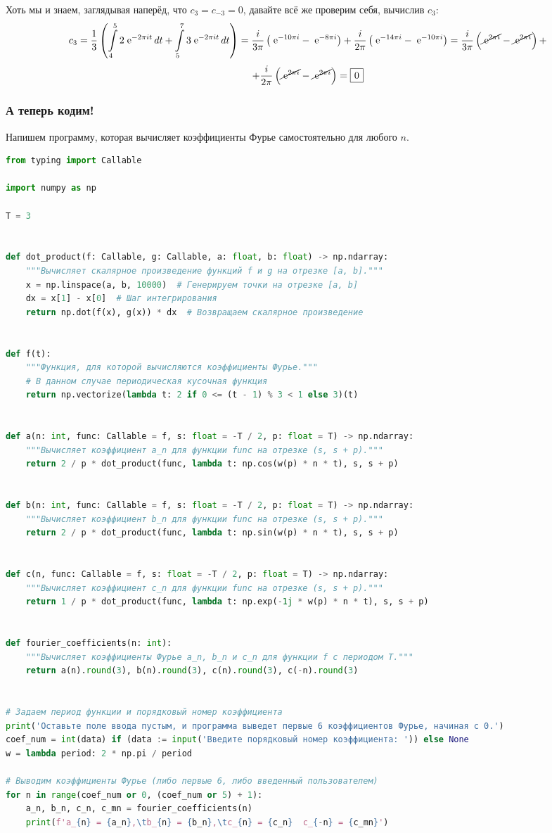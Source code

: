 \documentclass[a4paper]{article}
\newcommand{\addsubsubsection}[1]{
    \phantomsection
    \addcontentsline{toc}{subsubsection}{#1}
    \subsubsection*{\centering #1}
}
\newcommand*\msquared[1]{\tikz[baseline=(char.base)]{
            \node[shape=rectangle,draw,inner sep=4pt] (char) {$\displaystyle #1$};}}
\newcommand{\e}{\;\text{e}}
\let\oldint\int
\def\int{\oldint\limits}
\begin{document}
Хоть мы и знаем, заглядывая наперёд, что $c_3 = c_{-3} = 0$, давайте всё же проверим себя, вычислив $c_3$:
$$c_3 = \frac{1}{3}\left( \int_{4}^{5} 2\e^{-2\pi it}\,dt + \int_{5}^{7} 3\e^{-2\pi it}\,dt \right) = \frac{i}{3\pi}\left( \e^{-10\pi i} - \e^{-8\pi i} \right) + \frac{i}{2\pi}\left( \e^{-14\pi i} - \e^{-10\pi i} \right) = \frac{i}{3\pi}\left( \cancel{\e^{2\pi i}} - \cancel{\e^{2\pi i}} \right) +$$
$$+ \frac{i}{2\pi}\left( \cancel{\e^{2\pi i}} - \cancel{\e^{2\pi i}} \right) = \msquared{0}$$
\addsubsubsection{А теперь кодим!}
Напишем программу, которая вычисляет коэффициенты Фурье самостоятельно для любого $n$.
\begin{lstlisting}[language=Python, caption=Вычисление коэффициентов Фурье для кусочной функции]
from typing import Callable

import numpy as np

T = 3


def dot_product(f: Callable, g: Callable, a: float, b: float) -> np.ndarray:
    """Вычисляет скалярное произведение функций f и g на отрезке [a, b]."""
    x = np.linspace(a, b, 10000)  # Генерируем точки на отрезке [a, b]
    dx = x[1] - x[0]  # Шаг интегрирования
    return np.dot(f(x), g(x)) * dx  # Возвращаем скалярное произведение


def f(t):
    """Функция, для которой вычисляются коэффициенты Фурье."""
    # В данном случае периодическая кусочная функция
    return np.vectorize(lambda t: 2 if 0 <= (t - 1) % 3 < 1 else 3)(t)


def a(n: int, func: Callable = f, s: float = -T / 2, p: float = T) -> np.ndarray:
    """Вычисляет коэффициент a_n для функции func на отрезке (s, s + p)."""
    return 2 / p * dot_product(func, lambda t: np.cos(w(p) * n * t), s, s + p)


def b(n: int, func: Callable = f, s: float = -T / 2, p: float = T) -> np.ndarray:
    """Вычисляет коэффициент b_n для функции func на отрезке (s, s + p)."""
    return 2 / p * dot_product(func, lambda t: np.sin(w(p) * n * t), s, s + p)


def c(n, func: Callable = f, s: float = -T / 2, p: float = T) -> np.ndarray:
    """Вычисляет коэффициент c_n для функции func на отрезке (s, s + p)."""
    return 1 / p * dot_product(func, lambda t: np.exp(-1j * w(p) * n * t), s, s + p)


def fourier_coefficients(n: int):
    """Вычисляет коэффициенты Фурье a_n, b_n и c_n для функции f с периодом T."""
    return a(n).round(3), b(n).round(3), c(n).round(3), c(-n).round(3)


# Задаем период функции и порядковый номер коэффициента
print('Оставьте поле ввода пустым, и программа выведет первые 6 коэффициентов Фурье, начиная с 0.')
coef_num = int(data) if (data := input('Введите порядковый номер коэффициента: ')) else None
w = lambda period: 2 * np.pi / period

# Выводим коэффициенты Фурье (либо первые 6, либо введенный пользователем)
for n in range(coef_num or 0, (coef_num or 5) + 1):
    a_n, b_n, c_n, c_mn = fourier_coefficients(n)
    print(f'a_{n} = {a_n},\tb_{n} = {b_n},\tc_{n} = {c_n}  c_{-n} = {c_mn}')    
\end{lstlisting}
\end{document}
